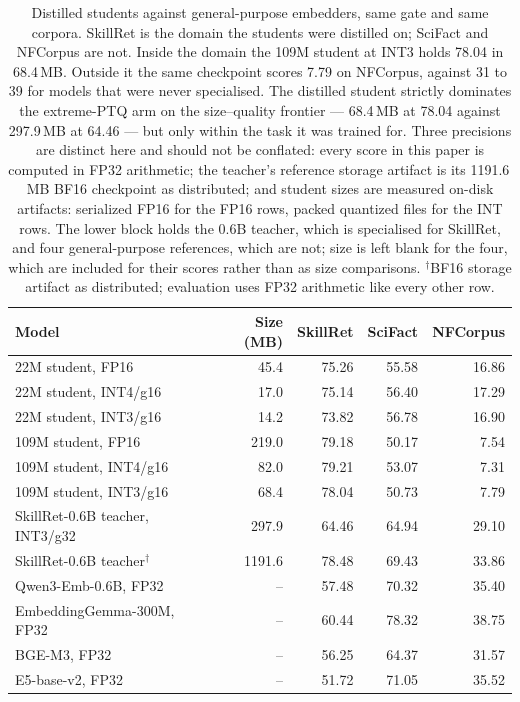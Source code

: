 \begin{table}[t]\centering\small
\caption{Distilled students against general-purpose embedders, same gate and same corpora.
SkillRet is the domain the students were distilled on; SciFact and NFCorpus are not. Inside
the domain the 109M student at INT3 holds 78.04 in 68.4\,MB. Outside it the same checkpoint
scores 7.79 on NFCorpus, against 31 to 39 for models that were never specialised. The distilled student strictly dominates the extreme-PTQ arm on the
size--quality frontier --- 68.4\,MB at 78.04 against 297.9\,MB at 64.46 --- but only within
the task it was trained for. Three precisions are distinct here and should not be conflated: every score in
this paper is computed in FP32 arithmetic; the teacher's reference storage artifact is its
1191.6\,MB BF16 checkpoint as distributed; and student sizes are measured on-disk artifacts:
serialized FP16 for the FP16 rows, packed quantized files for the INT rows. The lower block holds the 0.6B teacher, which is specialised for SkillRet, and
four general-purpose references, which are not; size is left blank for the four, which are
included for their scores rather than as size comparisons. $^{\dagger}$BF16 storage
artifact as distributed; evaluation uses FP32 arithmetic like every other row.}
\label{tab:students}
\begin{tabular}{lrrrr}
\toprule
Model & Size (MB) & SkillRet & SciFact & NFCorpus \\
\midrule
22M student, FP16 & 45.4 & 75.26 & 55.58 & 16.86 \\
22M student, INT4/g16 & 17.0 & 75.14 & 56.40 & 17.29 \\
22M student, INT3/g16 & 14.2 & 73.82 & 56.78 & 16.90 \\
109M student, FP16 & 219.0 & 79.18 & 50.17 & 7.54 \\
109M student, INT4/g16 & 82.0 & 79.21 & 53.07 & 7.31 \\
109M student, INT3/g16 & 68.4 & 78.04 & 50.73 & 7.79 \\
\midrule
SkillRet-0.6B teacher, INT3/g32 & 297.9 & 64.46 & 64.94 & 29.10 \\
SkillRet-0.6B teacher$^{\dagger}$ & 1191.6 & 78.48 & 69.43 & 33.86 \\
Qwen3-Emb-0.6B, FP32 & -- & 57.48 & 70.32 & 35.40 \\
EmbeddingGemma-300M, FP32 & -- & 60.44 & 78.32 & 38.75 \\
BGE-M3, FP32 & -- & 56.25 & 64.37 & 31.57 \\
E5-base-v2, FP32 & -- & 51.72 & 71.05 & 35.52 \\
\bottomrule
\end{tabular}\end{table}